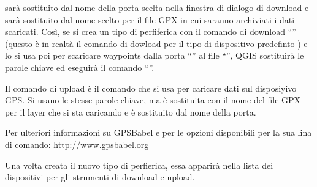  sarà sostituito dal nome della porta scelta nella finestra di dialogo di download e  sarà sostituito dal nome scelto per il file GPX in cui saranno archiviati i dati scaricati.
Così, se si crea un tipo di perfiferica con il comando di download {}``'' (questo è in realtà il comando di dowload per il tipo di dispositivo predefinto ) e lo si usa poi per scaricare waypoints dalla porta {}``'' al file {}``'', QGIS sostituirà le parole chiave ed eseguirà il comando {}``''.

Il comando di upload è il comando che si usa per caricare dati sul disposiyivo GPS.
Si usano le stesse parole chiave, ma  è sostituita con il nome del file GPX per il layer che si sta caricando e  è sostituito dal nome della porta.

Per ulteriori informazioni su GPSBabel e per le opzioni disponibili per la sua lina di comando: \url{http://www.gpsbabel.org}

Una volta creata il nuovo tipo di perfierica, essa apparirà nella lista dei dispositivi per gli strumenti di download e upload.
